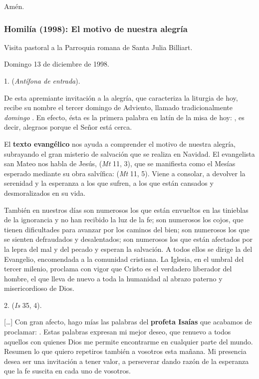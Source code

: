 \begin{body}
\begin{body}
Amén.



\subsubsection{Homilía (1998): El motivo de nuestra alegría}

Visita pastoral a la Parroquia romana de Santa Julia Billiart.

Domingo 13 de diciembre de 1998.

1.  (\emph{Antífona de entrada}).

De esta apremiante invitación a la alegría, que caracteriza la liturgia de hoy, recibe su nombre el tercer domingo de Adviento, llamado tradicionalmente \emph{domingo }. En efecto, ésta es la primera palabra en latín de la misa de hoy: , es decir, alegraos porque el Señor está cerca.

El \textbf{texto evangélico} nos ayuda a comprender el motivo de nuestra alegría, subrayando el gran misterio de salvación que se realiza en Navidad. El evangelista san Mateo nos habla de Jesús,  (\emph{Mt} 11, 3), que se manifiesta como el Mesías esperado mediante su obra salvífica:  (\emph{Mt} 11, 5). Viene a consolar, a devolver la serenidad y la esperanza a los que sufren, a los que están cansados y desmoralizados en su vida.

También en nuestros días son numerosos los que están envueltos en las tinieblas de la ignorancia y no han recibido la luz de la fe; son numerosos los cojos, que tienen dificultades para avanzar por los caminos del bien; son numerosos los que se sienten defraudados y desalentados; son numerosos los que están afectados por la lepra del mal y del pecado y esperan la salvación. A todos ellos se dirige la  del Evangelio, encomendada a la comunidad cristiana. La Iglesia, en el umbral del tercer milenio, proclama con vigor que Cristo es el verdadero liberador del hombre, el que lleva de nuevo a toda la humanidad al abrazo paterno y misericordioso de Dios.

2.  (\emph{Is} 35, 4).

[\ldots{}] Con gran afecto, hago mías las palabras del \textbf{profeta Isaías} que acabamos de proclamar: . Estas palabras expresan mi mejor deseo, que renuevo a todos aquellos con quienes Dios me permite encontrarme en cualquier parte del mundo. Resumen lo que quiero repetiros también a vosotros esta mañana. Mi presencia desea ser una invitación a tener valor, a perseverar dando razón de la esperanza que la fe suscita en cada uno de vosotros.


\end{body}
\end{body}
